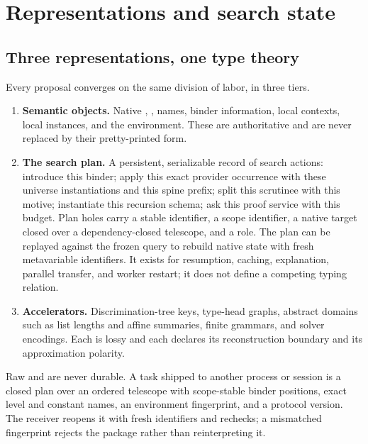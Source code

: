 \section{Representations and search state}\label{sec:representations}

\subsection{Three representations, one type theory}

Every proposal converges on the same division of labor, in three tiers.

\begin{enumerate}
\item \textbf{Semantic objects.} Native , , names, binder information, local contexts, local instances, and the environment. These are authoritative and are never replaced by their pretty-printed form.
\item \textbf{The search plan.} A persistent, serializable record of search actions: introduce this binder; apply this exact provider occurrence with these universe instantiations and this spine prefix; split this scrutinee with this motive; instantiate this recursion schema; ask this proof service with this budget. Plan holes carry a stable identifier, a scope identifier, a native target closed over a dependency-closed telescope, and a role. The plan can be replayed against the frozen query to rebuild native state with fresh metavariable identifiers. It exists for resumption, caching, explanation, parallel transfer, and worker restart; it does not define a competing typing relation.
\item \textbf{Accelerators.} Discrimination-tree keys, type-head graphs, abstract domains such as list lengths and affine summaries, finite grammars, and solver encodings. Each is lossy and each declares its reconstruction boundary and its approximation polarity.
\end{enumerate}

\begin{invariant}\label{inv:serialize}
Raw  and  are never durable. A task shipped to another process or session is a closed plan over an ordered telescope with scope-stable binder positions, exact level and constant names, an environment fingerprint, and a protocol version. The receiver reopens it with fresh identifiers and rechecks; a mismatched fingerprint rejects the package rather than reinterpreting it.
\end{invariant}

